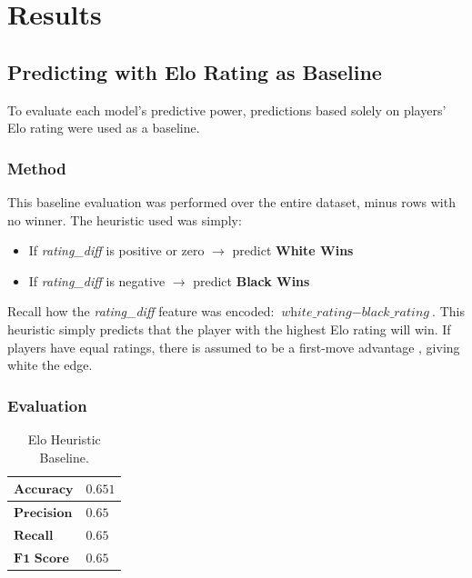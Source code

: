 \documentclass[12pt]{article}
\begin{document}
\section{Results}
\label{sec:results}

\subsection{Predicting with Elo Rating as Baseline}
To evaluate each model's predictive power, predictions based solely on players' Elo rating were used as a baseline. 

\subsubsection{Method}
This baseline evaluation was performed over the entire dataset, minus rows with no winner. The heuristic used was simply:

\begin{itemize}
  \item If \textit{rating\_diff} is positive or zero $\rightarrow$ predict \textbf{White Wins}
  \item If \textit{rating\_diff} is negative $\rightarrow$ predict \textbf{Black Wins}
\end{itemize}

 Recall how the \textit{rating\_diff} feature was encoded: $\textit{white\_rating} - \textit{black\_rating}$. This heuristic simply predicts that the player with the highest Elo rating will win. If players have equal ratings, there is assumed to be a first-move advantage \cite{Streeter1946}, giving white the edge.

\subsubsection{Evaluation}

\begin{table}[h!]
\centering
\begin{tabular}{|l|l|}
\hline
$\textbf{Accuracy}$ & $0.651$ \\ \hline
$\textbf{Precision}$ & $0.65$ \\ \hline
$\textbf{Recall}$ & $0.65$ \\ \hline
$\textbf{F1 Score}$ & $0.65$ \\ \hline
\end{tabular}
\caption{Elo Heuristic Baseline.}
\label{tab:el-baseline}
\end{table}
\end{document}
